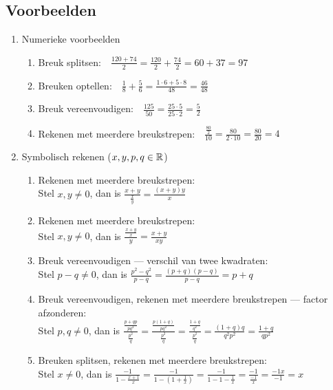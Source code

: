 \documentclass[numbers,wordchoicegiven]{ximera}
\renewcommand\ds{}
\begin{document}
\subsection{Voorbeelden}
\begin{enumerate}
	\item Numerieke voorbeelden
	\begin{enumerate}
		\item Breuk splitsen:\ \ $\ds{\frac{120+74}{2}=\frac{120}{2}+\frac{74}{2}=60+37=97}$
		\item Breuken optellen:\ \ $\ds{\frac{1}{8}+\frac{5}{6}=\frac{1 \cdot 6+5 \cdot 8}{48}=\frac{46}{48}}$
		\item Breuk vereenvoudigen:\ \ $\ds{\frac{125}{50}=\frac{25 \cdot 5}{25 \cdot 2}=\frac{5}{2}}$
		\item Rekenen met meerdere breukstrepen:\ \ $\ds{\frac{\frac{80}{2}}{10}=\frac{80}{2\cdot10}=\frac{80}{20}=4}$
	\end{enumerate}
	
	\item Symbolisch rekenen ($x,y,p,q\in\mathbb{R}$)
	\begin{enumerate}
		\item Rekenen met meerdere breukstrepen:\\
		Stel $x,y \neq 0$, dan is $\ds{\frac{x+y}{\frac{x}{y}}=\frac{(x+y)y}{x}}$
		\item Rekenen met meerdere breukstrepen:\\
		Stel $x,y \neq 0$, dan is $\ds{\frac{\frac{x+y}{x}}{\ y\ }=\frac{x+y}{xy}}$
		\item Breuk vereenvoudigen --- verschil van twee kwadraten:\\
		Stel $p-q \neq 0$, dan is $\ds{\frac{p^{2}-q^{2}}{p-q}=\frac{(p+q)(p-q)}{p-q}=p+q}$
		\item Breuk vereenvoudigen, rekenen met meerdere breukstrepen --- factor afzonderen:\\
		Stel $p,q \neq 0$, dan is $\ds{\frac{\frac{p+qp}{pq^{2}}}{\frac{p^{2}}{q}}=\frac{\frac{p(1+q)}{pq^{2}}}{\frac{p^{2}}{q}}=
			\frac{\frac{1+q}{q^{2}}}{\frac{p^{2}}{q}}=\frac{(1+q)q}{q^{2}p^2}=\frac{1+q}{qp^{2}}}$
		\item Breuken splitsen, rekenen met meerdere breukstrepen:\\
		Stel $x \neq 0$, dan is $\ds{\frac{-1}{1-\frac{x+1}{x}}=\frac{-1}{1-\left(1+\frac{1}{x}\right)}=\frac{-1}{1-1-\frac{1}{x}}=\frac{-1}{\frac{-1}{x}}=\frac{-1x}{-1}=x}$
	\end{enumerate}
\end{enumerate}
\end{document}

